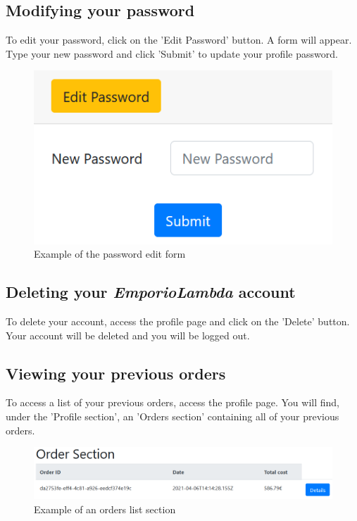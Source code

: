 \subsection{Modifying your password}
To edit your password, click on the 'Edit Password' button. A form will appear. Type your new password and click 'Submit' to update your profile password.

\begin{figure}[H]
\centering
\includegraphics[scale=0.6]{res/Immagini/EditPassword}
\caption{Example of the password edit form}
\end{figure}

\subsection{Deleting your \textit{EmporioLambda} account}
To delete your account, access the profile page and click on the 'Delete' button. Your account will be deleted and you will be logged out.

\subsection{Viewing your previous orders}
To access a list of your previous orders, access the profile page. You will find, under the 'Profile section', an 'Orders section' containing all of your previous orders.

\begin{figure}[H]
\centering
\includegraphics[scale=0.6]{res/Immagini/OrderSection}
\caption{Example of an orders list section}
\end{figure}

